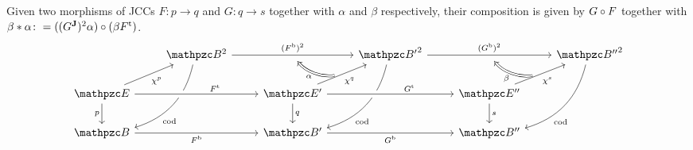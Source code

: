 \documentclass{lmcs} %
\theoremstyle{plain}\newtheorem{satz}[thm]{Satz} %
\begin{document}
% 
			Given two morphisms of JCCs $F:p\to q$ and $G:q\to s$ together with $\alpha$ and $\beta$ respectively, their composition is given by $G\circ F$ together with $\beta * \alpha\colon=(({G}^{\mathbf{J}})^{2}\alpha)\circ (\beta{F}^{\mathrm{t}})$.
				\[\begin{tikzcd}
				& {\Arr{\ct{B}}} && {\Arr{\ct{B'}}} && {\Arr{\ct{B''}}} \\
				{\ct{E}} && {\ct{E'}} && {\ct{E''}} \\
				{\ct{B}} && {\ct{B'}} && {\ct{B''}}
				\arrow[""{name=0, anchor=center, inner sep=0}, "{{\Arr{(\fb{F})}}}", from=1-2, to=1-4]
				\arrow["\cod"{pos=0.7}, bend left, from=1-2, to=3-1]
				\arrow[""{name=1, anchor=center, inner sep=0}, "{{\Arr{(\fb{G})}}}", from=1-4, to=1-6]
				\arrow["\cod"{pos=0.7}, bend left, from=1-4, to=3-3]
				\arrow["\cod"{pos=0.7}, bend left, from=1-6, to=3-5]
				\arrow["{{\jcomp{p}}}"', from=2-1, to=1-2]
				\arrow["{{\ft{F}}}", from=2-1, to=2-3, crossing over, pos=0.65]
				\arrow["p"', from=2-1, to=3-1]
				\arrow[""{name=2, anchor=center, inner sep=0}, "{{\jcomp{q}}}"', from=2-3, to=1-4]
				\arrow["{{\ft{G}}}", from=2-3, to=2-5, crossing over, pos=0.65]
				\arrow["q", from=2-3, to=3-3]
				\arrow[""{name=3, anchor=center, inner sep=0}, "{{\jcomp{s}}}"', from=2-5, to=1-6]
				\arrow["s", from=2-5, to=3-5]
				\arrow["{{\fb{F}}}"', from=3-1, to=3-3]
				\arrow["{{\fb{G}}}"', from=3-3, to=3-5]
				\arrow["\alpha", bend left, shorten <=6pt, shorten >=6pt, Rightarrow, from=2, to=0]
				\arrow["\beta", bend left, shorten <=6pt, shorten >=6pt, Rightarrow, from=3, to=1]
			\end{tikzcd}\]
			
\end{document}
